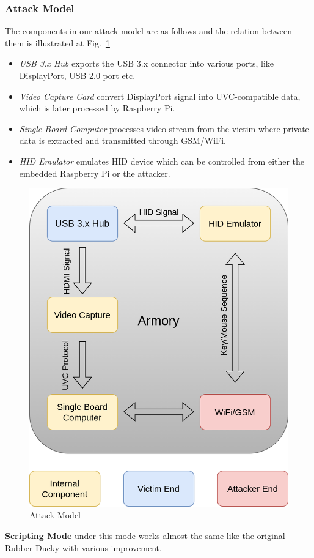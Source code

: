 \subsubsection{Attack Model}
The components in our attack model are as follows and the relation between them is illustrated at Fig.~\ref{fig:attack_model}
\begin{itemize}
	\item\textit{USB 3.x Hub} exports the USB 3.x connector into various ports, like DisplayPort, USB 2.0 port etc.
	\item\textit{Video Capture Card} convert DisplayPort signal into UVC-compatible data, which is later processed by Raspberry Pi.
	\item\textit{Single Board Computer} processes video stream from the victim where private data is extracted and transmitted through GSM/WiFi.
	\item\textit{HID Emulator} emulates HID device which can be controlled from either the embedded Raspberry Pi or the attacker.
\end{itemize}
\begin{figure}[t]
	\centering
	\includegraphics[width=0.75\linewidth]{./Figs/attack_model.png}
	\caption{Attack Model}
	\label{fig:attack_model}
\end{figure}
\textbf{Scripting Mode}
\tool under this mode works almost the same like the original Rubber Ducky with various improvement.

